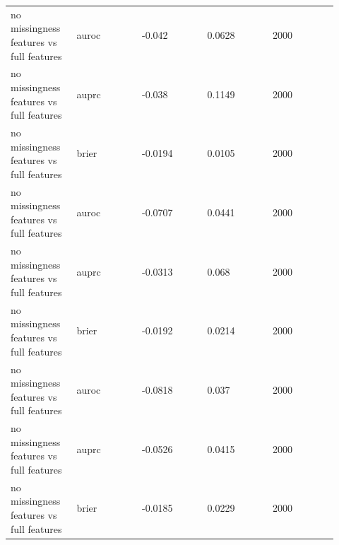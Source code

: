 \documentclass[11pt]{article}
\begin{document}
\begin{landscape}
\begin{longtable}{L{0.184\linewidth} L{0.184\linewidth} L{0.184\linewidth} L{0.184\linewidth} L{0.184\linewidth}}
no missingness features vs full features & auroc & -\allowbreak{}0.\allowbreak{}042 & 0.\allowbreak{}0628 & 2000 \\
no missingness features vs full features & auprc & -\allowbreak{}0.\allowbreak{}038 & 0.\allowbreak{}1149 & 2000 \\
no missingness features vs full features & brier & -\allowbreak{}0.\allowbreak{}0194 & 0.\allowbreak{}0105 & 2000 \\
no missingness features vs full features & auroc & -\allowbreak{}0.\allowbreak{}0707 & 0.\allowbreak{}0441 & 2000 \\
no missingness features vs full features & auprc & -\allowbreak{}0.\allowbreak{}0313 & 0.\allowbreak{}068 & 2000 \\
no missingness features vs full features & brier & -\allowbreak{}0.\allowbreak{}0192 & 0.\allowbreak{}0214 & 2000 \\
no missingness features vs full features & auroc & -\allowbreak{}0.\allowbreak{}0818 & 0.\allowbreak{}037 & 2000 \\
no missingness features vs full features & auprc & -\allowbreak{}0.\allowbreak{}0526 & 0.\allowbreak{}0415 & 2000 \\
no missingness features vs full features & brier & -\allowbreak{}0.\allowbreak{}0185 & 0.\allowbreak{}0229 & 2000 \\
\end{longtable}
\normalsize
\end{landscape}
\end{document}
